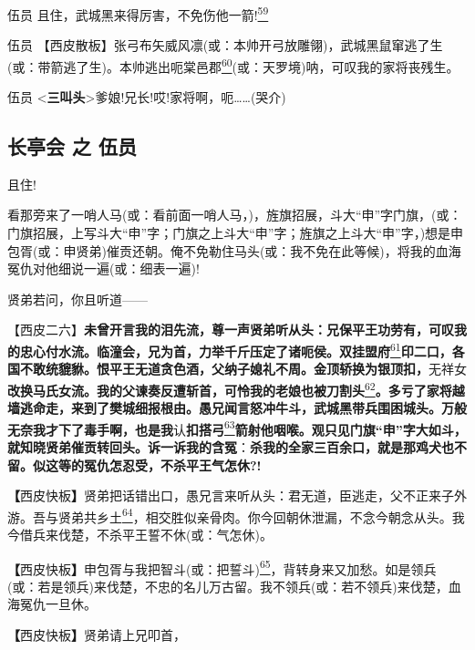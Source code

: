 伍员
且住，武城黑来得厉害，不免伤他一箭!\protect\hyperlink{fn59}{\textsuperscript{59}}

伍员
【西皮散板】张弓布矢威风凛(或：本帅开弓放雕翎)，武城黑鼠窜逃了生(或：带箭逃了生)。本帅逃出呃棠邑郡\protect\hyperlink{fn60}{\textsuperscript{60}}(或：天罗境)呐，可叹我的家将丧残生。

伍员
\textless{}\textbf{三叫头}\textgreater{}爹娘!兄长!哎!家将啊，呃\ldots{}\ldots{}(哭介)

\newpage
\hypertarget{ux957fux4eadux4f1a-ux4e4b-ux4f0dux5458}{%
\subsection{长亭会 之
伍员}\label{ux957fux4eadux4f1a-ux4e4b-ux4f0dux5458}}

且住!

看那旁来了一哨人马(或：看前面一哨人马，)，旌旗招展，斗大``申''字门旗，(或：门旗招展，上写斗大``申''字；门旗之上斗大``申''字；旌旗之上斗大``申''字，)想是申包胥(或：申贤弟)催贡还朝。俺不免勒住马头(或：我不免在此等候)，将我的血海冤仇对他细说一遍(或：细表一遍)!

贤弟若问，你且听道------

【西皮二六】\textbf{未曾开言我的泪先流，尊一声贤弟听从头：兄保平王功劳有，可叹我的忠心付水流。临潼会，兄为首，力举千斤压定了诸呃侯。双挂盟府}\protect\hyperlink{fn61}{\textsuperscript{61}}\textbf{印二口，各国不敢统貔貅。恨平王无道贪色酒，父纳子媳礼不周。金顶轿换为银顶扣，}无祥女\textbf{改换马氏女流。我的父谏奏反遭斩首，可怜我的老娘也被刀割头}\protect\hyperlink{fn62}{\textsuperscript{62}}\textbf{。多亏了家将越墙逃命走，来到了樊城细报根由。愚兄闻言怒冲牛斗，武城黑带兵围困城头。万般无奈我才下了毒手啊，也是我}认\textbf{扣搭弓}\protect\hyperlink{fn63}{\textsuperscript{63}}\textbf{箭射他咽喉。观只见门旗``申''字大如斗，就知晓贤弟催贡转回头。诉一诉我的含冤}：\textbf{杀我的全家三百余口，就是那鸡犬也不留。似这等的冤仇怎忍受，不杀平王气怎休​?!}

\textbf{【}西皮快板\textbf{】}贤弟把话错出口，愚兄言来听从头：君无道，臣逃走，父不正来子外游。吾与贤弟共乡土\protect\hyperlink{fn64}{\textsuperscript{64}}，相交胜似亲骨肉。你今回朝休泄漏，不念今朝念从头。我今借兵来伐楚，不杀平王誓不休(或：气怎休)。

\textbf{【}西皮快板\textbf{】}申包胥与我把智斗(或：把誓斗)\protect\hyperlink{fn65}{\textsuperscript{65}}，背转身来又加愁。如是领兵(或：若是领兵)来伐楚，不忠的名儿万古留。我不领兵(或：若不领兵)来伐楚，血海冤仇一旦休。

\textbf{【}西皮快板\textbf{】}贤弟请上兄叩首，

